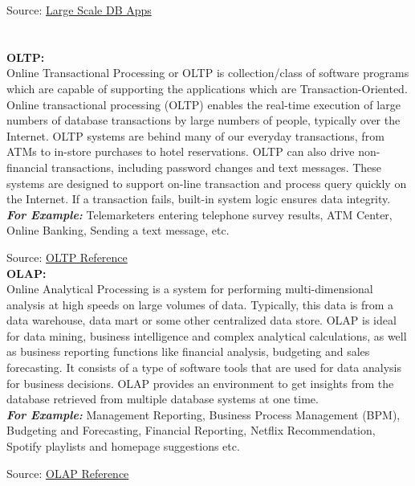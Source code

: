 \documentclass[12pt]{article}
\begin{document}
Source: \href{https://www.softwaretestinghelp.com/database-management-software/}{Large Scale DB Apps} 

\newpage

\section{} 
\textbf{OLTP:} \\
Online Transactional Processing or OLTP is collection/class of software programs which are capable of supporting the applications which are Transaction-Oriented. Online transactional processing (OLTP) enables the real-time execution of large numbers of database transactions by large numbers of people, typically over the Internet. OLTP systems are behind many of our everyday transactions, from ATMs to in-store purchases to hotel reservations. OLTP can also drive non-financial transactions, including password changes and text messages. These systems are designed to support on-line transaction and process query quickly on the Internet. If a transaction fails, built-in system logic ensures data integrity.
\\
\textbf{\textit{For Example:}} Telemarketers entering telephone survey results, ATM Center, Online Banking, Sending a text message, etc.

Source: \href{https://database.guide/what-is-oltp/}{OLTP Reference}\\

\noindent
\textbf{OLAP:} \\
Online Analytical Processing is a system for performing multi-dimensional analysis at high speeds on large volumes of data. Typically, this data is from a data warehouse, data mart or some other centralized data store. OLAP is ideal for data mining, business intelligence and complex analytical calculations, as well as business reporting functions like financial analysis, budgeting and sales forecasting. It consists of a type of software tools that are used for data analysis for business decisions. OLAP provides an environment to get insights from the database retrieved from multiple database systems at one time.
\\
\textbf{\textit{For Example:}} Management Reporting, Business Process Management (BPM), Budgeting and Forecasting, Financial Reporting, Netflix Recommendation, Spotify playlists and homepage suggestions etc.

Source: \href{https://olap.com/olap-definition/}{OLAP Reference} \\
\end{document}
